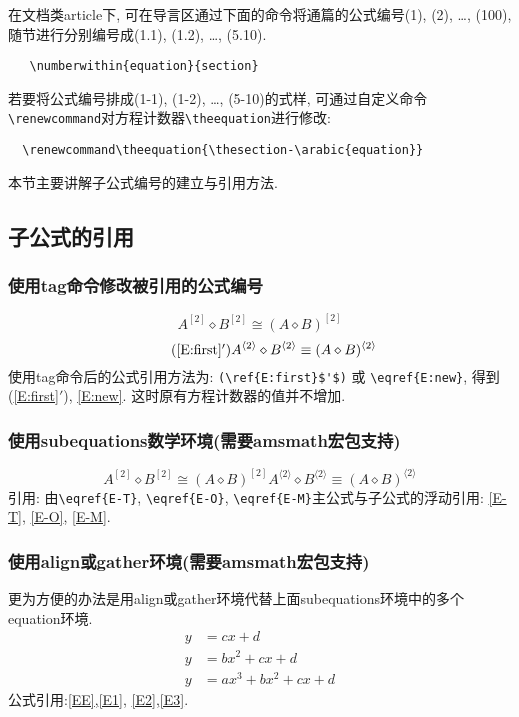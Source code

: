 在文档类article下, 可在导言区通过下面的命令将通篇的公式编号(1), (2), \dots, (100),
随节进行分别编号成(1.1), (1.2), \dots, (5.10).
\begin{verbatim}
   \numberwithin{equation}{section}
\end{verbatim}
若要将公式编号排成(1-1), (1-2), \dots, (5-10)的式样, 可通过自定义命令\verb/\renewcommand/对方程计数器\verb/\theequation/进行修改:
\begin{verbatim}
  \renewcommand\theequation{\thesection-\arabic{equation}}
\end{verbatim}

本节主要讲解子公式编号的建立与引用方法. 
\subsection{子公式的引用}
\subsubsection{使用tag命令修改被引用的公式编号}
\begin{equation}\label{E:first}
A^{[2]} \diamond B^{[2]} \cong (A \diamond B)^{[2]}
\end{equation}
\begin{equation}\tag{\ref{E:first}$'$}\label{E:new}
A^{\langle 2 \rangle} \diamond B^{\langle 2\rangle}
\equiv (A \diamond B)^{\langle 2 \rangle}
\end{equation}
使用tag命令后的公式引用方法为: \verb/(\ref{E:first}$'$)/ 或 \verb/\eqref{E:new}/, 得到(\ref{E:first}$'$), \eqref{E:new}.
这时原有方程计数器的值并不增加.

\subsubsection{使用subequations数学环境(需要amsmath宏包支持)}
\begin{subequations}\label{E-T}
\begin{equation}\label{E-O}
A^{[2]} \diamond B^{[2]} \cong (A \diamond B)^{[2]}
\end{equation}
\begin{equation}\label{E-M}
A^{\langle 2 \rangle} \diamond B^{\langle 2\rangle}
\equiv (A \diamond B)^{\langle 2\rangle}
\end{equation}
\end{subequations}
引用: 由\verb/\eqref{E-T}/, \verb/\eqref{E-O}/, \verb/\eqref{E-M}/主公式与子公式的浮动引用:
\eqref{E-T}, \eqref{E-O}, \eqref{E-M}.

\subsubsection{使用align或gather环境(需要amsmath宏包支持)}
更为方便的办法是用align或gather环境代替上面subequations环境中的多个equation环境.
\begin{subequations}\label{EE}
\begin{align}
y&=cx+d \label{E1}\\
y&=bx^2+cx+d \label{E2}\\
y&=ax^3+bx^2+cx+d \label{E3}
\end{align}
\end{subequations}
公式引用:\eqref{EE},\eqref{E1}, \eqref{E2},\eqref{E3}.


